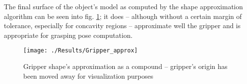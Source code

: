 The final surface of the object's model as computed by the shape approximation
algorithm can be seen into fig. \ref{fig:approximation-of-gripper}; it does --
although without a certain margin of tolerance, especially for concavity
regions -- approximate well the gripper and is appropriate for grasping pose
computation.

\begin{figure}[htbp]
\centering
\texttt{[image: ./Results/Gripper\_approx]}
\caption{Gripper shape's approximation as a compound -- gripper's origin has
been moved away for visualization purposes \label{fig:approximation-of-gripper}}
\end{figure}


